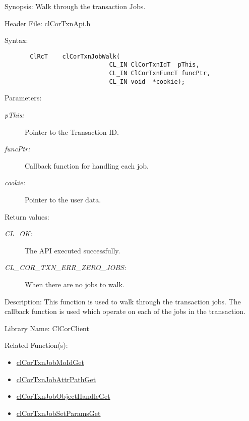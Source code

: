 \begin{Desc}
\item[Synopsis:]Walk through the transaction Jobs.\end{Desc}
\begin{Desc}
\item[Header File:]\hyperlink{cl_cor_txn_api_8h}{cl\-Cor\-Txn\-Api.h}\end{Desc}
\begin{Desc}
\item[Syntax:]

\footnotesize\begin{verbatim}       ClRcT    clCorTxnJobWalk( 
                             CL_IN ClCorTxnIdT  pThis,
                             CL_IN ClCorTxnFuncT funcPtr,
                             CL_IN void  *cookie);
\end{verbatim}
\normalsize
\end{Desc}
\begin{Desc}
\item[Parameters:]
\begin{description}
\item[{\em p\-This:}]Pointer to the Transaction ID. \item[{\em func\-Ptr:}]Callback function for handling each job. \item[{\em cookie:}]Pointer to the user data.\end{description}
\end{Desc}
\begin{Desc}
\item[Return values:]
\begin{description}
\item[{\em CL\_\-OK:}]The API executed successfully. \item[{\em CL\_\-COR\_\-TXN\_\-ERR\_\-ZERO\_\-JOBS:}]When there are no jobs to walk.\end{description}
\end{Desc}
\begin{Desc}
\item[Description:]This function is used to walk through the transaction jobs. The callback function is used which operate on each of the jobs in the transaction.\end{Desc}
\begin{Desc}
\item[Library Name:]Cl\-Cor\-Client\end{Desc}
\begin{Desc}
\item[Related Function(s):]\begin{itemize}
\item \hyperlink{group__group13}{cl\-Cor\-Txn\-Job\-Mo\-Id\-Get} \item \hyperlink{group__group13}{cl\-Cor\-Txn\-Job\-Attr\-Path\-Get} \item \hyperlink{group__group13}{cl\-Cor\-Txn\-Job\-Object\-Handle\-Get} \item \hyperlink{group__group13}{cl\-Cor\-Txn\-Job\-Set\-Params\-Get} \end{itemize}
\end{Desc}
